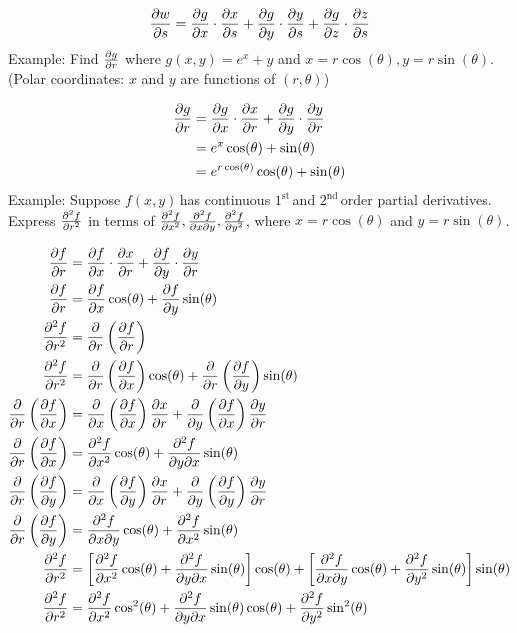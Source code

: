 \documentclass{article}
\newcommand{\n}{\leavevmode \newline} %
\newcommand{\fxy}{$f(x,y)\,$} %
\newcommand{\first}{$1^{\text{st}}\,$} %
\newcommand{\second}{$2^{\text{nd}}\,$} %
\numberwithin{equation}{subsection} %
\begin{document}
\begin{equation}
    \pdv{w}{s}=\pdv{g}{x}\cdot\pdv{x}{s}+\pdv{g}{y}\cdot\pdv{y}{s}+\pdv{g}{z}\cdot\pdv{z}{s}
\end{equation}
\n
Example: Find $\pdv{g}{r}$ where $g(x,y)=e^x+y$ and $x=r\cos(\theta),y=r\sin(\theta)$. (Polar coordinates: $x$ and $y$ are functions of $(r,\theta)$)

\begin{equation}
    \begin{split}
        \pdv{g}{r}&=\pdv{g}{x}\cdot\pdv{x}{r}+\pdv{g}{y}\cdot\pdv{y}{r}\\
        &=e^x\cos(\theta)+\sin(\theta)\\
        &=e^{r\cos(\theta)}\cos(\theta)+\sin(\theta)
    \end{split}
\end{equation}
\n
Example: Suppose \fxy has continuous \first and \second order partial derivatives. Express $\pdv[2]{f}{r}$ in terms of $\pdv[2]{f}{x},\pdv{f}{x}{y},\pdv[2]{f}{y}$, where $x=r\cos(\theta)$ and $y=r\sin(\theta)$.

\begin{equation}
    \begin{split}
        \pdv{f}{r}&=\pdv{f}{x}\cdot\pdv{x}{r}+\pdv{f}{y}\cdot\pdv{y}{r}\\
        \pdv{f}{r}&=\pdv{f}{x}\cos(\theta)+\pdv{f}{y}\sin(\theta)\\
        \pdv[2]{f}{r}&=\pdv{r}\left(\pdv{f}{r}\right)\\
        \pdv[2]{f}{r}&=\pdv{r}\left(\pdv{f}{x}\right)\cos(\theta)+\pdv{r}\left(\pdv{f}{y}\right)\sin(\theta)\\
        \pdv{r}\left(\pdv{f}{x}\right)&=\pdv{x}\left(\pdv{f}{x}\right)\pdv{x}{r}+\pdv{y}\left(\pdv{f}{x}\right)\pdv{y}{r}\\
        \pdv{r}\left(\pdv{f}{x}\right)&=\pdv[2]{f}{x}\cos(\theta)+\pdv{f}{y}{x}\sin(\theta)\\
        \pdv{r}\left(\pdv{f}{y}\right)&=\pdv{x}\left(\pdv{f}{y}\right)\pdv{x}{r}+\pdv{y}\left(\pdv{f}{y}\right)\pdv{y}{r}\\
        \pdv{r}\left(\pdv{f}{y}\right)&=\pdv{f}{x}{y}\cos(\theta)+\pdv[2]{f}{x}\sin(\theta)\\
        \pdv[2]{f}{r}&=\left[\pdv[2]{f}{x}\cos(\theta)+\pdv{f}{y}{x}\sin(\theta) \right]\cos(\theta) + \left[\pdv{f}{x}{y}\cos(\theta)+\pdv[2]{f}{y}\sin(\theta) \right]\sin(\theta)\\
        \pdv[2]{f}{r}&=\pdv[2]{f}{x}\cos^2(\theta)+\pdv{f}{y}{x}\sin(\theta)\cos(\theta)+\pdv[2]{f}{y}\sin^2(\theta)
        \end{split}
\end{equation}
\end{document}
